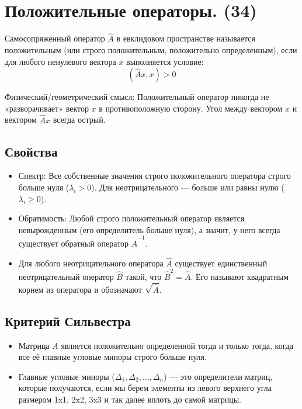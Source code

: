 \documentclass[14pt]{extreport}
\begin{document}
    \chapter{Положительные операторы. (34)}

    \begin{defbox}
        Самосопряженный оператор $\hat{A}$ в евклидовом пространстве называется положительным (или строго положительным, положительно определенным), если для любого ненулевого вектора $x$ выполняется условие:$$(\hat{A}x, x) > 0$$
    \end{defbox}

    \begin{defbox}
        Физический/геометрический смысл: Положительный оператор никогда не «разворачивает» вектор $x$ в противоположную сторону. Угол между вектором $x$ и вектором $\hat{A}x$ всегда острый.
    \end{defbox}

    \section{Свойства}
    \begin{itemize}
        \item Спектр: Все собственные значения строго положительного оператора строго больше нуля ($\lambda_i > 0$). Для неотрицательного — больше или равны нулю ($\lambda_i \ge 0$).
        \item Обратимость: Любой строго положительный оператор является невырожденным (его определитель больше нуля), а значит, у него всегда существует обратный оператор $\hat{A}^{-1}$.
        \item  Для любого неотрицательного оператора $\hat{A}$ существует единственный неотрицательный оператор $\hat{B}$ такой, что $\hat{B}^2 = \hat{A}$. Его называют квадратным корнем из оператора и обозначают $\sqrt{\hat{A}}$.
    \end{itemize}

    \section{Критерий Сильвестра}

    \begin{itemize}
        \item Матрица $A$ является положительно определенной тогда и только тогда, когда все её главные угловые миноры строго больше нуля.
        \item Главные угловые миноры ($\Delta_1, \Delta_2, \dots, \Delta_n$) — это определители матриц, которые получаются, если мы берем элементы из левого верхнего угла размером 1x1, 2x2, 3x3 и так далее вплоть до самой матрицы.
    \end{itemize}
\end{document}
